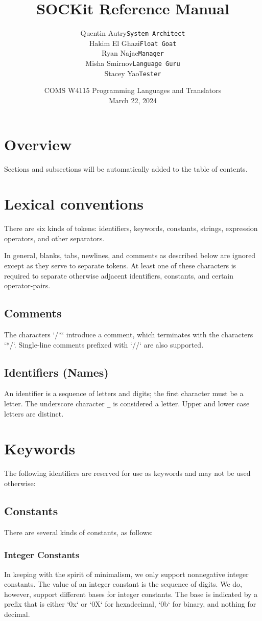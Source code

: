 \documentclass[12pt,a4paper]{article}
\title{SOCKit Reference Manual}
\author{
    \begin{tabular}{rl} %
    Quentin Autry & \texttt{System Architect} \\
    Hakim El Ghazi & \texttt{Float Goat} \\
    Ryan Najac & \texttt{Manager} \\
    Misha Smirnov & \texttt{Language Guru} \\
    Stacey Yao & \texttt{Tester}
    \end{tabular}
}
\date{COMS W4115 Programming Languages and Translators\\March 22, 2024}
\begin{document}
\thispagestyle{empty}
\maketitle
\newpage
\tableofcontents %
\newpage

\section{Overview}
Sections and subsections will be automatically added to the table of contents.

\section{Lexical conventions}
There are six kinds of tokens: identifiers, keywords, constants, strings, expression operators, and other separators.

In general, blanks, tabs, newlines, and comments as described below are ignored except as they serve to separate tokens. At least one of these characters is required to separate otherwise adjacent identifiers, constants, and certain operator-pairs.

\subsection{Comments}
The characters `/*` introduce a comment, which terminates with the characters `*/`. Single-line comments prefixed with `//` are also supported.

\subsection{Identifiers (Names)}
An identifier is a sequence of letters and digits; the first character must be a letter. The underscore character \texttt{\_} is considered a letter. Upper and lower case letters are distinct.

\section{Keywords}
The following identifiers are reserved for use as keywords and may not be used otherwise:

\subsection{Constants}
There are several kinds of constants, as follows:
\subsubsection{Integer Constants}
In keeping with the spirit of minimalism, we only support nonnegative integer constants. The value of an integer constant is the sequence of digits. We do, however, support different bases for integer constants. The base is indicated by a prefix that is either `0x` or `0X` for hexadecimal, `0b` for binary, and nothing for decimal.
\end{document}
